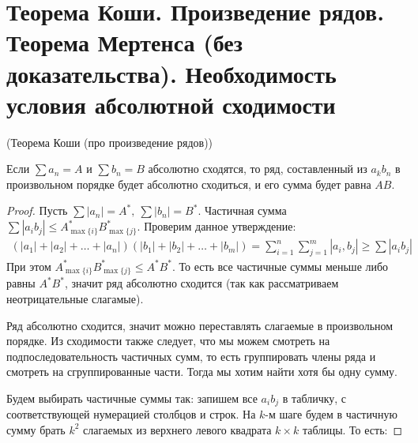 \section{Теорема Коши. Произведение рядов. Теорема Мертенса (без доказательства). Необходимость условия абсолютной сходимости}
\begin{theorem}
    (Теорема Коши (про произведение рядов)) 
    
    Если $\sum a_n = A$ и $\sum b_n = B$ абсолютно сходятся, то
    ряд, составленный из $a_kb_n$ в произвольном порядке будет абсолютно сходиться, и его сумма будет равна $AB$.
\end{theorem}
\begin{proof}
    Пусть $\sum |a_n| = A^*,\ \sum|b_n| = B^*$. Частичная сумма $\sum |a_i b_j| \leq A^*_{\max\{i\}}B^*_{\max\{j\}}$. Проверим данное утверждение:
    \begin{gather*}
        (|a_1| + |a_2| + \ldots + |a_n|)(|b_1| + |b_2|+\ldots + |b_m|) = \sum \limits_{i=1}^n \sum \limits_{j=1}^m |a_i, b_j| \geq \sum|a_i b_j|
    \end{gather*}
    При этом $A^*_{\max\{i\}} B^*_{\max\{j\}} \leqslant A^* B^*$. То есть все частичные суммы 
    меньше либо равны $A^*B^*$, значит ряд абсолютно сходится (так как рассматриваем неотрицательные слагамые).

    Ряд абсолютно сходится, значит можно переставлять слагаемые в произвольном порядке.
    Из сходимости также следует, что мы можем смотреть на подпоследовательность частичных сумм, то есть группировать
    члены ряда и смотреть на сгруппированные части. Тогда мы хотим найти хотя бы одну сумму.

    Будем выбирать частичные суммы так: запишем все $a_ib_j$ в табличку,
    с соответствующей нумерацией столбцов и строк. На $k$-м шаге
    будем в частичную сумму брать $k^2$ слагаемых из верхнего
    левого квадрата $k\times k$ таблицы. То есть:
      

\end{proof}
